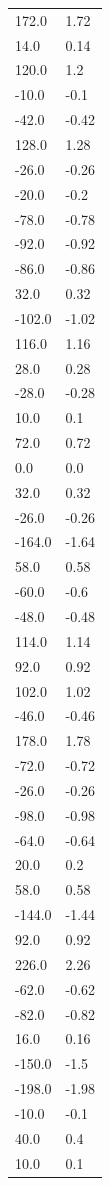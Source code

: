 \begin{longtable}{ll}
172.0 & 1.72 \\
14.0 & 0.14 \\
120.0 & 1.2 \\
-10.0 & -0.1 \\
-42.0 & -0.42 \\
128.0 & 1.28 \\
-26.0 & -0.26 \\
-20.0 & -0.2 \\
-78.0 & -0.78 \\
-92.0 & -0.92 \\
-86.0 & -0.86 \\
32.0 & 0.32 \\
-102.0 & -1.02 \\
116.0 & 1.16 \\
28.0 & 0.28 \\
-28.0 & -0.28 \\
10.0 & 0.1 \\
72.0 & 0.72 \\
0.0 & 0.0 \\
32.0 & 0.32 \\
-26.0 & -0.26 \\
-164.0 & -1.64 \\
58.0 & 0.58 \\
-60.0 & -0.6 \\
-48.0 & -0.48 \\
114.0 & 1.14 \\
92.0 & 0.92 \\
102.0 & 1.02 \\
-46.0 & -0.46 \\
178.0 & 1.78 \\
-72.0 & -0.72 \\
-26.0 & -0.26 \\
-98.0 & -0.98 \\
-64.0 & -0.64 \\
20.0 & 0.2 \\
58.0 & 0.58 \\
-144.0 & -1.44 \\
92.0 & 0.92 \\
226.0 & 2.26 \\
-62.0 & -0.62 \\
-82.0 & -0.82 \\
16.0 & 0.16 \\
-150.0 & -1.5 \\
-198.0 & -1.98 \\
-10.0 & -0.1 \\
40.0 & 0.4 \\
10.0 & 0.1 \\

\end{longtable}
